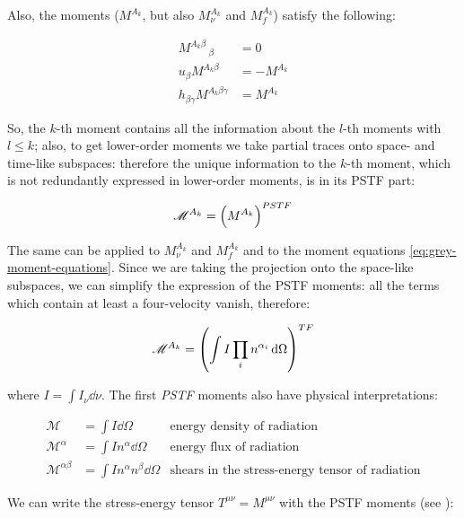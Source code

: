 \documentclass[main.tex]{subfiles}
\begin{document}
Also, the moments (\(M^{A_k}\), but also \(M^{A_k}_\nu\) and \(M^{A_k}_f\)) satisfy the following:

\begin{subequations}
\begin{align}
  M^{A_k \beta}\,_\beta &= 0 \\
  u_\beta M^{A_k \beta} &= -M^{A_k} \\
  h_{\beta \gamma} M^{A_k \beta \gamma} &= M^{A_k}
\end{align}
\end{subequations}

So, the \(k\)-th moment contains all the information about the \(l\)-th moments with \(l\leq k\); also, to get lower-order moments we take partial traces onto space- and time-like subspaces: therefore the unique information to the \(k\)-th moment, which is not redundantly expressed in lower-order moments, is in its PSTF part:

\begin{equation}
  \mathscr M ^{A_k} = \qty(M^{A_k}) ^{PSTF}
\end{equation}

The same can be applied to \(M^{A_k}_\nu\) and \(M^{A_k}_f\) and to the moment equations \eqref{eq:grey-moment-equations}. Since we are taking the projection onto the space-like subspaces, we can simplify the expression of the PSTF moments: all the terms which contain at least a four-velocity vanish, therefore:

\begin{equation} \label{eq:trace-free-moments-definition}
  \mathscr M^{A_k} = \qty(\int I \prod_i n^{\alpha_i} \dd{\Omega})^{TF}
\end{equation}

where \(I = \int I_\nu \dd{\nu}\).
The first \emph{PSTF} moments also have physical interpretations:

\begin{subequations}
\begin{align}
   \mathscr M &= \int  I \dd{\Omega}    & \text{energy density of radiation}  \\
   \mathscr M^\alpha &= \int I n^\alpha\dd{\Omega}  & \text{energy flux of radiation}  \\
   \mathscr M^{\alpha\beta} &= \int I n^\alpha n^\beta \dd{\Omega}   & \text{shears in the stress-energy tensor of radiation}
\end{align}
\end{subequations}

We can write the stress-energy tensor \(T^{\mu\nu} = M^{\mu\nu}\) with the PSTF moments (see \cite[eq. 4.9]{Thorne:1981feb}):
\end{document}
